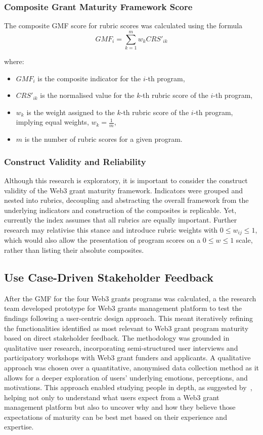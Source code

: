 \documentclass[conference]{IEEEtran}
\begin{document}
\subsubsection{Composite Grant Maturity Framework Score}\label{sec_3.2.2}
The composite GMF score for rubric scores was calculated using the formula
\footnotesize
\[
GMF_i = \sum_{k=1}^{m} w_k CRS'_{ik}
\]

where:

\begin{itemize}
    \item \( GMF_i \) is the composite indicator for the \( i \)-th program,
    \item \( CRS'_{ik} \) is the normalised value for the \( k \)-th rubric score of the \( i \)-th program,
    \item \( w_k \) is the weight assigned to the \( k \)-th rubric score of the \( i \)-th program, implying equal weights, \( w_k = \frac{1}{m} \),
    \item \( m \) is the number of rubric scores for a given program.
\end{itemize}\vspace{7pt}
\normalsize
\subsubsection{Construct Validity and Reliability}\label{sec_3.2.3}
Although this research is exploratory, it is important to consider the construct validity of the Web3 grant maturity framework. Indicators were grouped and nested into rubrics, decoupling and abstracting the overall framework from the underlying indicators and construction of the composites is replicable. Yet, currently the index assumes that all rubrics are equally important. Further research may relativise this stance and introduce rubric weights with \( 0 \leq w_{ij} \leq 1 \), which would also allow the presentation of program scores on a \( 0 \leq w \leq 1 \) scale, rather than listing their absolute composites.

\subsection{Use Case-Driven Stakeholder Feedback}\label{sec_3.3}
After the GMF for the four Web3 grants programs was calculated, a the research team developed prototype for Web3 grants management platform to test the findings following a user-centric design approach. This meant iteratively refining the functionalities identified as most relevant to Web3 grant program maturity based on direct stakeholder feedback. The methodology was grounded in qualitative user research, incorporating semi-structured user interviews and participatory workshops with Web3 grant funders and applicants. A qualitative approach was chosen over a quantitative, anonymised data collection method as it allows for a deeper exploration of users' underlying emotions, perceptions, and motivations. This approach enabled studying people in depth, as suggested by~\cite{norman_design_2013}, helping not only to understand what users expect from a Web3 grant management platform but also to uncover why and how they believe those expectations of maturity can be best met based on their experience and expertise.
\end{document}
